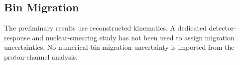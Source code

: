 \subsection{Bin Migration}
The preliminary results use reconstructed kinematics. A dedicated detector-response and nuclear-smearing study has not been used to assign migration uncertainties. No numerical bin-migration uncertainty is imported from the proton-channel analysis.
